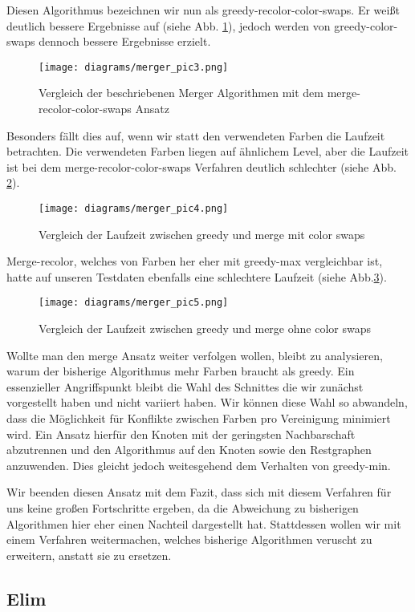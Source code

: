 \documentclass[11pt]{article}
\begin{document}
Diesen Algorithmus bezeichnen wir nun als greedy-recolor-color-swaps.
Er weißt deutlich bessere Ergebnisse auf (siehe Abb. \ref{fig:merge3}), jedoch werden von greedy-color-swaps dennoch bessere Ergebnisse erzielt.
\begin{figure}
  \texttt{[image: diagrams/merger\_pic3.png]}
  \caption{Vergleich der beschriebenen Merger Algorithmen mit dem merge-recolor-color-swaps Ansatz}
  \label{fig:merge3}
\end{figure}
Besonders fällt dies auf, wenn wir statt den verwendeten Farben die Laufzeit betrachten. Die verwendeten Farben liegen auf ähnlichem Level,
aber die Laufzeit ist bei dem merge-recolor-color-swaps Verfahren deutlich schlechter (siehe Abb. \ref{fig:merge4}).\\
\begin{figure}
  \texttt{[image: diagrams/merger\_pic4.png]}
  \caption{Vergleich der Laufzeit zwischen greedy und merge mit color swaps}
  \label{fig:merge4}
\end{figure}
Merge-recolor, welches von Farben her eher mit greedy-max vergleichbar ist, hatte auf unseren Testdaten ebenfalls eine schlechtere Laufzeit (siehe Abb.\ref{fig:merge5}).
\begin{figure}
  \texttt{[image: diagrams/merger\_pic5.png]}
  \caption{Vergleich der Laufzeit zwischen greedy und merge ohne color swaps}
  \label{fig:merge5}
\end{figure}

Wollte man den merge Ansatz weiter verfolgen wollen, bleibt zu analysieren, warum der bisherige Algorithmus mehr Farben braucht als greedy.
Ein essenzieller Angriffspunkt bleibt die Wahl des Schnittes die wir zunächst vorgestellt haben und nicht variiert haben.
Wir können diese Wahl so abwandeln, dass die Möglichkeit für Konflikte zwischen Farben pro Vereinigung minimiert wird.
Ein Ansatz hierfür den Knoten mit der geringsten Nachbarschaft abzutrennen und den Algorithmus auf den Knoten sowie den Restgraphen anzuwenden.
Dies gleicht jedoch weitesgehend dem Verhalten von greedy-min.

Wir beenden diesen Ansatz mit dem Fazit, dass sich mit diesem Verfahren für uns keine großen Fortschritte ergeben,
da die Abweichung zu bisherigen Algorithmen hier eher einen Nachteil dargestellt hat.
Stattdessen wollen wir mit einem Verfahren weitermachen, welches bisherige Algorithmen veruscht zu erweitern, anstatt sie zu ersetzen.

\subsection{Elim}
\end{document}
